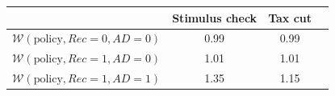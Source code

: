 \documentclass{econsocart}
\begin{document}
\begin{tabular}{@{}lccc@{}}
\toprule
                          & Stimulus check & Tax cut \\ \midrule
$\mathcal{W}(\text{policy}, Rec=0, AD=0)$ & 0.99 & 0.99 \\
$\mathcal{W}(\text{policy}, Rec=1, AD=0)$ & 1.01  & 1.01 \\
$\mathcal{W}(\text{policy}, Rec=1, AD=1)$ & 1.35 & 1.15 \\ \bottomrule
\end{tabular}
\end{document}
